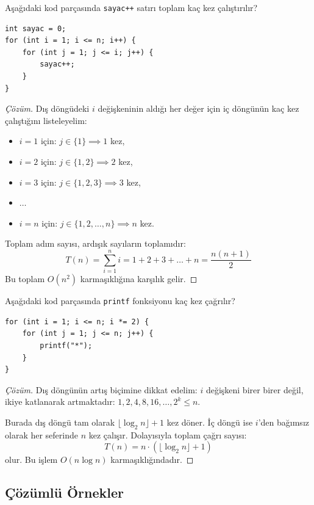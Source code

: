 \begin{example}
Aşağıdaki kod parçasında \texttt{sayac++} satırı toplam kaç kez çalıştırılır?
\begin{lstlisting}[language=CTemel]
int sayac = 0;
for (int i = 1; i <= n; i++) {
    for (int j = 1; j <= i; j++) {
        sayac++;
    }
}
\end{lstlisting}
\end{example}

\begin{proof}[Çözüm]
Dış döngüdeki $i$ değişkeninin aldığı her değer için iç döngünün kaç kez çalıştığını listeleyelim:
\begin{itemize}
    \item $i = 1$ için: $j \in \{1\} \implies 1$ kez,
    \item $i = 2$ için: $j \in \{1, 2\} \implies 2$ kez,
    \item $i = 3$ için: $j \in \{1, 2, 3\} \implies 3$ kez,
    \item $\dots$
    \item $i = n$ için: $j \in \{1, 2, \dots, n\} \implies n$ kez.
\end{itemize}
Toplam adım sayısı, ardışık sayıların toplamıdır:
\[
T(n) = \sum_{i=1}^{n} i = 1 + 2 + 3 + \dots + n = \frac{n(n+1)}{2}
\]
Bu toplam $O(n^2)$ karmaşıklığına karşılık gelir.
\end{proof}

\begin{example}
Aşağıdaki kod parçasında \texttt{printf} fonksiyonu kaç kez çağrılır?
\begin{lstlisting}[language=CTemel]
for (int i = 1; i <= n; i *= 2) {
    for (int j = 1; j <= n; j++) {
        printf("*");
    }
}
\end{lstlisting}
\end{example}

\begin{proof}[Çözüm]
Dış döngünün artış biçimine dikkat edelim: $i$ değişkeni birer birer değil, ikiye katlanarak artmaktadır: $1, 2, 4, 8, 16, \dots, 2^k \le n$. 

Burada dış döngü tam olarak $\lfloor \log_2 n \rfloor + 1$ kez döner. İç döngü ise $i$'den bağımsız olarak her seferinde $n$ kez çalışır. Dolayısıyla toplam çağrı sayısı:
\[
T(n) = n \cdot (\lfloor \log_2 n \rfloor + 1)
\]
olur. Bu işlem $O(n \log n)$ karmaşıklığındadır.
\end{proof}

\subsection{Çözümlü Örnekler}

